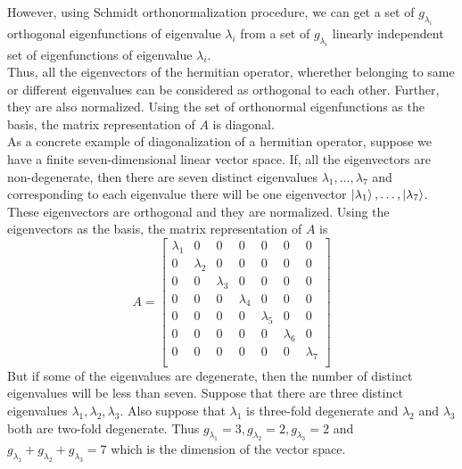 	However, using Schmidt orthonormalization procedure, we can get a set of $g_{\lambda_i}$ orthogonal 
	eigenfunctions %
	  of eigenvalue $\lambda_i$ from a set of $g_{\lambda_i}$ linearly independent set of
	  eigenfunctions
	   of eigenvalue $\lambda_i$.\\
	   
	   Thus, all the eigenvectors of the hermitian operator, wherether belonging to same or different eigenvalues can be considered as orthogonal to each other. Further, they are also normalized. Using the set of orthonormal eigenfunctions as the basis, the matrix representation of $A$ is diagonal. \\
	   
	   As a concrete example of diagonalization of a hermitian operator, suppose we have a finite seven-dimensional linear vector space. If, all the eigenvectors are non-degenerate, then there are seven distinct eigenvalues $\lambda_1, \ldots, \lambda_7$ and corresponding to each eigenvalue there will be one eigenvector $\ket{\lambda_1}, \ldots, \ket{\lambda_7}$. These eigenvectors are orthogonal and they are normalized. Using the eigenvectors as the basis, the matrix representation of $A$ is 
	   \begin{equation}
		   A = \left[
		   \begin{matrix}
	\lambda_1 & 0 & 0 & 0 & 0 & 0 & 0 \\
	0 & \lambda_2 & 0 & 0 & 0 & 0 & 0 \\
	0 & 0 & \lambda_3 & 0 & 0 & 0 & 0 \\
	0 & 0 & 0 & \lambda_4 & 0 & 0 & 0 \\
	0 & 0 & 0 & 0 & \lambda_5 & 0 & 0 \\
	0 & 0 & 0 & 0 & 0 & \lambda_6 & 0 \\
	0 & 0 & 0 & 0 & 0 & 0 & \lambda_7 \\
		   \end{matrix}
		   \right]
	   \end{equation}
	But if some of the eigenvalues are degenerate, then the number of distinct eigenvalues will be less than seven. Suppose that there are three distinct eigenvalues $\lambda_1, \lambda_2, \lambda_3$. Also suppose that $\lambda_1$ is three-fold degenerate and $\lambda_2$ and $\lambda_3$ both are two-fold degenerate. Thus $g_{\lambda_1}=3, g_{\lambda_2}=2, g_{\lambda_3}=2$ and $g_{\lambda_1} + g_{\lambda_2} + g_{\lambda_3}=7$ which is the dimension of the vector space.\\
	
